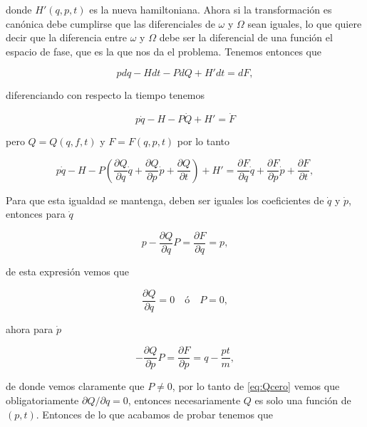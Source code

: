 \documentclass[a4paper,10pt]{article}
\numberwithin{equation}{section}
\begin{document}
donde $H'(q,p,t)$ es la nueva hamiltoniana. Ahora si la transformación es canónica 
debe cumplirse que las diferenciales de $\omega$ y $\Omega$ sean iguales, lo que 
quiere decir que la diferencia entre $\omega$ y $\Omega$ debe ser la diferencial 
de una función el espacio de fase, que es la que nos da el problema. Tenemos entonces 
que 

\begin{equation}
 pdq - Hdt - PdQ + H'dt = dF,
\end{equation}

diferenciando con respecto la tiempo tenemos 

\begin{equation}
 p\dot{q} - H - P\dot{Q} + H' = \dot{F}
\end{equation}

pero $Q = Q(q,f,t)$ y  $F = F(q,p,t)$ por lo tanto 

\begin{equation}
 p\dot{q} - H - P\left(\frac{\partial Q}{\partial q}\dot{q} 
 + \frac{\partial Q}{\partial p}\dot{p} + \frac{\partial Q}{\partial t} \right) + 
 H' = \frac{\partial F}{\partial q}\dot{q} 
 + \frac{\partial F}{\partial p}\dot{p} + \frac{\partial F}{\partial t},
\end{equation}

Para que esta igualdad se mantenga, deben ser iguales los coeficientes 
de $\dot{q}$ y $\dot{p}$, entonces para $\dot{q}$

\begin{equation}
 p - \frac{\partial Q}{\partial q}P = \frac{\partial F}{\partial q} = p,
\end{equation}

de esta expresión vemos que 

\begin{equation}
 \frac{\partial Q}{\partial q}= 0\quad \text{ó} \quad P = 0,
 \label{eq:Qcero}
\end{equation}

ahora para $\dot{p}$

\begin{equation}
 - \frac{\partial Q}{\partial p} P = \frac{\partial F}{\partial p} = q - \frac{pt}{m},
\label{eq:Pfinal}
\end{equation}

de donde vemos claramente que $P \ne 0$, por lo tanto de \eqref{eq:Qcero} vemos que 
obligatoriamente $\partial Q / \partial q = 0$, entonces necesariamente $Q$ es solo 
una función de $(p,t)$. Entonces de lo que acabamos de probar tenemos que 
\end{document}
